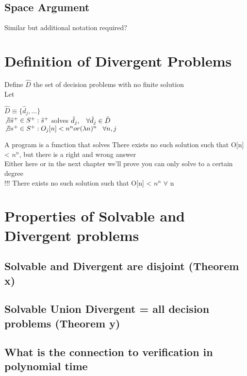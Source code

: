 \documentclass[11pt]{article}
\begin{document}
\subsection{Space Argument}
Similar but additional notation required?








\newpage

\section{Definition of Divergent Problems}
Define $\hat{D}$ the set of decision problems with no finite solution\\
Let 
\begin{center}
$
\hat{D} \equiv \{\hat{d}_j,...\}
$
\\ \vspace{3mm}
$
\not \exists \hat{s}^{+} \in S^{+} : \hat{s}^{+}$ solves $\hat{d}_j, \hspace{3mm} \forall \hat{d}_j \in \hat{D}
$
\\
$
 \not \exists s^{+} \in S^{+} : O_j \lbrack n \rbrack < n^n or (\lambda n)^n \hspace{3mm} \forall n,j
$
\end{center}
A program is a function that solves
There exists no such solution such that O[n] < $n^n$, but there is a right and wrong answer\\
Either here or in the next chapter we'll prove you can only solve to a certain degree\\
 !!! There exists no such solution such that O[n] < $n^n$ \hspace{3mm} $\forall$ n

\section{Properties of Solvable and Divergent problems}
\subsection{Solvable and Divergent are disjoint (Theorem x)}
\subsection{Solvable Union Divergent = all decision problems (Theorem y)}
\subsection{What is the connection to verification in polynomial time}
\end{document}
